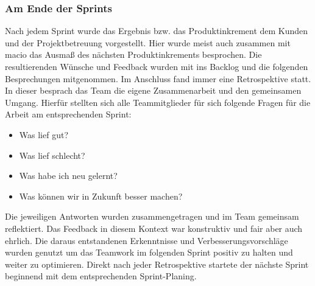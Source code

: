 \documentclass[10pt, a4paper, draft]{article}
\begin{document}
\subsubsection{Am Ende der Sprints}
Nach jedem Sprint wurde das Ergebnis bzw. das Produktinkrement dem Kunden und der Projektbetreuung vorgestellt.
Hier wurde meist auch zusammen mit macio das Ausmaß des nächsten Produktinkrements besprochen.
Die resultierenden Wünsche und Feedback wurden mit ins Backlog und die folgenden Besprechungen mitgenommen.
Im Anschluss fand immer eine Retrospektive statt.
In dieser besprach das Team die eigene Zusammenarbeit und den gemeinsamen Umgang.
Hierfür stellten sich alle Teammitglieder für sich folgende Fragen für die Arbeit am entsprechenden Sprint:
\begin{itemize}[noitemsep,topsep=0pt,parsep=0pt,partopsep=0pt]
  \item Was lief gut?
  \item Was lief schlecht?
  \item Was habe ich neu gelernt?
  \item Was können wir in Zukunft besser machen?
\end{itemize}
Die jeweiligen Antworten wurden zusammengetragen und im Team gemeinsam reflektiert.
Das Feedback in diesem Kontext war konstruktiv und fair aber auch ehrlich.
Die daraus entstandenen Erkenntnisse und Verbesserungsvorschläge wurden genutzt um das Teamwork im folgenden Sprint positiv zu halten und weiter zu optimieren.
Direkt nach jeder Retrospektive startete der nächste Sprint beginnend mit dem entsprechenden Sprint-Planing.
\end{document}
